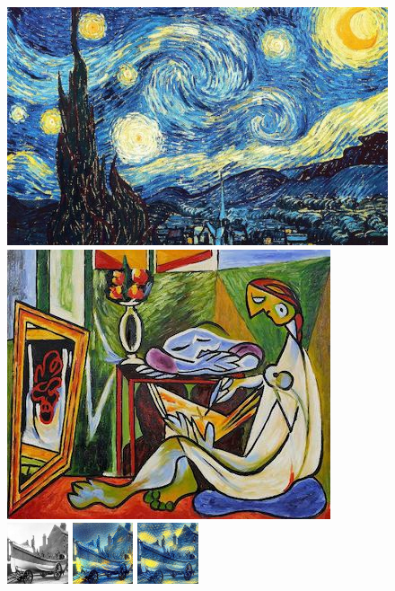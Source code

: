 \documentclass[runningheads]{llncs}
\begin{document}
\begin{figure}
  \includegraphics[height=0.13\textwidth]{starry_night_small.jpg}
  \hspace{7mm}
  \includegraphics[height=0.13\textwidth]{la_muse_small.jpg} \\
  \includegraphics[width=0.16\textwidth]{26_orig.jpg}
  \includegraphics[width=0.16\textwidth]{26_starry_baseline.jpg}
  \includegraphics[width=0.16\textwidth]{26_starry_mine.jpg}

\end{figure}
\end{document}
